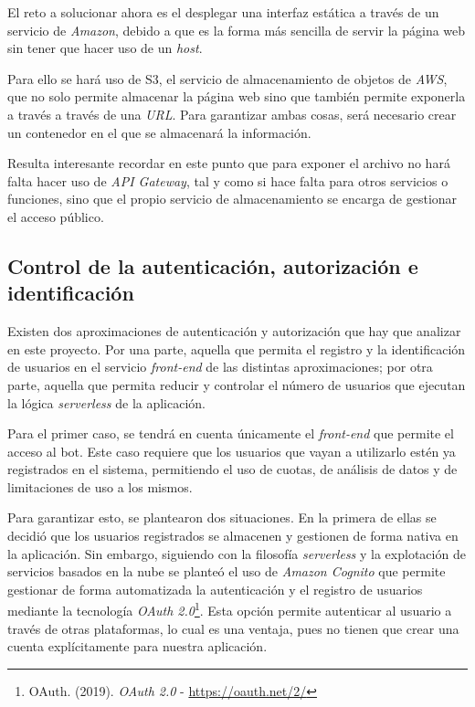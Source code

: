 \documentclass[11pt,spanish,listoffigures]{tfgetsinf}
\begin{document}
El reto a solucionar ahora es el desplegar una interfaz estática a través de un servicio de \textit{Amazon}, debido a que es la forma más sencilla de servir la página web sin tener que hacer uso de un \textit{host}. 

Para ello se hará uso de S3, el servicio de almacenamiento de objetos de \textit{AWS}, que no solo permite almacenar la página web sino que también permite exponerla a través a través de una \textit{URL}. Para garantizar ambas cosas, será necesario crear un contenedor en el que se almacenará la información.

Resulta interesante recordar en este punto que para exponer el archivo no hará falta hacer uso de \textit{API Gateway}, tal y como si hace falta para otros servicios o funciones, sino que el propio servicio de almacenamiento se encarga de gestionar el acceso público.

\subsection{Control de la autenticación, autorización e identificación}
\label{subsec:control-autenticacion}

Existen dos aproximaciones de autenticación y autorización que hay que analizar en este proyecto. Por una parte, aquella que permita el registro y la identificación de usuarios en el servicio \textit{front-end} de las distintas aproximaciones; por otra parte, aquella que permita reducir y controlar el número de usuarios que ejecutan la lógica \textit{serverless} de la aplicación.

Para el primer caso, se tendrá en cuenta únicamente el \textit{front-end} que permite el acceso al bot. Este caso requiere que los usuarios que vayan a utilizarlo estén ya registrados en el sistema, permitiendo el uso de cuotas, de análisis de datos y de limitaciones de uso a los mismos. 

Para garantizar esto, se plantearon dos situaciones. En la primera de ellas se decidió que los usuarios registrados se almacenen y gestionen de forma nativa en la aplicación. Sin embargo, siguiendo con la filosofía \textit{serverless} y la explotación de servicios basados en la nube se planteó el uso de \textit{Amazon Cognito} que permite gestionar de forma automatizada la autenticación y el registro de usuarios mediante la tecnología \textit{OAuth 2.0}\footnote{OAuth. (2019). \textit{OAuth 2.0} - \url{https://oauth.net/2/}}. Esta opción permite autenticar al usuario a través de otras plataformas, lo cual es una ventaja, pues no tienen que crear una cuenta explícitamente para nuestra aplicación. 
\end{document}
